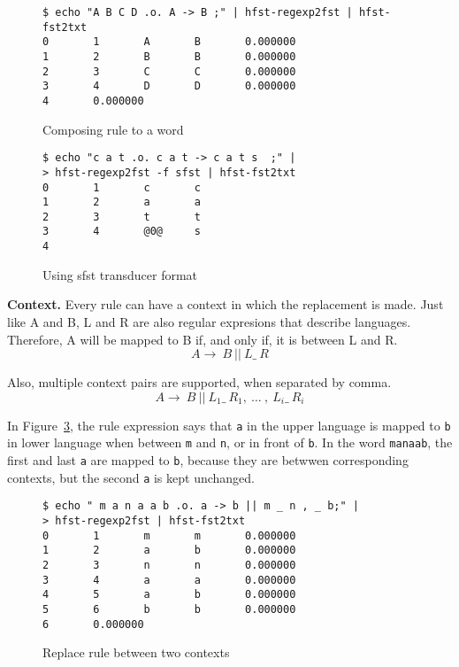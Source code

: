 \documentclass{llncs}
\begin{document}
\begin{figure} [h!]
\begin{verbatim}
$ echo "A B C D .o. A -> B ;" | hfst-regexp2fst | hfst-fst2txt
0       1       A       B       0.000000
1       2       B       B       0.000000
2       3       C       C       0.000000
3       4       D       D       0.000000
4       0.000000
\end{verbatim}
\caption{Composing rule to a word}
\label{fig:replace_compose}
\end{figure}


\begin{figure} [h!]
\begin{verbatim}
$ echo "c a t .o. c a t -> c a t s  ;" |
> hfst-regexp2fst -f sfst | hfst-fst2txt
0       1       c       c
1       2       a       a
2       3       t       t
3       4       @0@     s
4
\end{verbatim}
\caption{Using sfst transducer format}
\label{fig:sfst_format}
\end{figure}




\textbf{Context.} Every rule can have a context in which the replacement is made. Just like A and B, L and R are also regular expresions that describe languages. Therefore, A will be mapped to B if, and only if, it is between L and R.
\begin{equation}
A \rightarrow\ B\ ||\ L \_\  R
\end{equation}
 
Also, multiple context pairs are supported, when separated by comma.
\begin{equation}
A \rightarrow\ B\ ||\ L_1 \_\  R_1 ,\ \ldots\ ,\ L_i \_\  R_i
\end{equation}

In Figure~\ref{fig:multiple_contexts}, the rule expression says that \verb!a! in the upper language is mapped to \verb!b! in lower language when between \verb!m! and \verb!n!, or in front of \verb!b!. In the word \verb!manaab!, the first and last \verb!a! are mapped to \verb!b!, because they are betwwen corresponding contexts, but the second \verb!a! is kept unchanged.

\begin{figure} [h!]
\begin{verbatim}
$ echo " m a n a a b .o. a -> b || m _ n , _ b;" |
> hfst-regexp2fst | hfst-fst2txt
0       1       m       m       0.000000
1       2       a       b       0.000000
2       3       n       n       0.000000
3       4       a       a       0.000000
4       5       a       b       0.000000
5       6       b       b       0.000000
6       0.000000
\end{verbatim}
\caption{Replace rule between two contexts}
\label{fig:multiple_contexts}
\end{figure}
\end{document}
